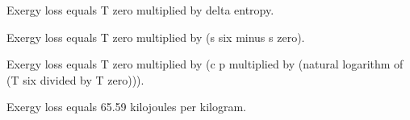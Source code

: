 Exergy loss equals T zero multiplied by delta entropy.  

Exergy loss equals T zero multiplied by (s six minus s zero).  

Exergy loss equals T zero multiplied by (c p multiplied by (natural logarithm of (T six divided by T zero))).  

Exergy loss equals 65.59 kilojoules per kilogram.